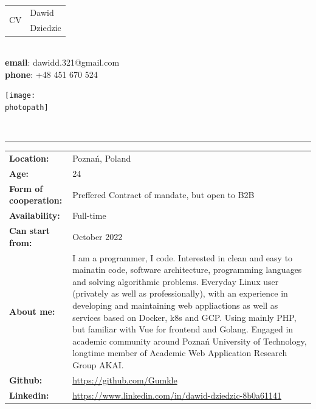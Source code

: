 \documentclass[10pt]{letter}
\makeatletter
\newcommand{\firstname}{Dawid}
\newcommand{\lastname}{Dziedzic}
\newcommand{\age}{24}
\newcommand{\whereami}{Poznań, Poland}
\newcommand{\applyfor}{Golang Developer}
\newcommand{\form}{Preffered Contract of mandate, but open to B2B}
\newcommand{\availability}{Full-time}
\newcommand{\startfrom}{October 2022}
\newcommand{\photopath}{zdjecie.jpg}
\newcommand{\email}{dawidd.321@gmail.com}
\newcommand{\phone}{+48 451 670 524}
\newcommand{\github}{https://github.com/Gumkle}
\newcommand{\linkedin}{https://www.linkedin.com/in/dawid-dziedzic-8b0a61141}
\newcommand{\aboutme}{
    I am a programmer, I code. Interested in clean and easy to 
    mainatin code, software architecture, programming languages and 
    solving algorithmic problems. Everyday Linux user 
    (privately as well as professionally), with an experience in 
    developing and maintaining  web appliactions as well as 
    services based on Docker, k8s and GCP. Using mainly PHP, but
    familiar with Vue for frontend and Golang. Engaged in 
    academic community around Poznań University of Technology, 
    longtime member of Academic Web Application Research Group AKAI.
}
\makeatother
\begin{document}
    \begin{minipage}[t]{0.5\textwidth}
        \begin{tabular}{r | l}
            \multirow{2}{*}{\fontsize{70pt}{70pt} \selectfont CV} & \large{\firstname} \\
            & \large{\lastname} \\[4ex]
        \end{tabular} \\[2\baselineskip]
        \hspace*{1cm}\textbf{email}: \email \\
        \hspace*{1cm}\textbf{phone}: \phone
    \end{minipage}
    \hfill
    \begin{minipage}{0.5\textwidth}
        \begin{flushright}
            \texttt{[image: \\photopath]}            
        \end{flushright}
    \end{minipage}
    \\[1\baselineskip]
    \hrule
    \begin{tabular}{p{4cm} l}
        \textbf{Location:} & \whereami\\
        \textbf{Age:} & \age\\
        \textbf{Form of cooperation:} & \form\\
        \textbf{Availability:} & \availability\\
        \textbf{Can start from:} & \startfrom\\
        \vspace{-40pt}\textbf{About me:} & \begin{minipage}{0.75\textwidth}
            \aboutme
        \end{minipage}\\
        \textbf{Github:} & \href{\github}{\github}\\
        \textbf{Linkedin:} & \href{\linkedin}{\linkedin}\\
    \end{tabular}\\[2\baselineskip]
\end{document}
